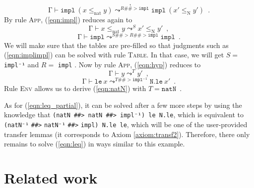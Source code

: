 \documentclass{llncs}
\begin{document}
\begin{example}
\begin{equation}
    \enspace ,
    \label{eqn:leq}
    \end{equation}
    \begin{equation}
    \mathrm{\Gamma} \vdash
    \mathtt{impl}~(x \leq_{\mathrm{nat}} y)
    \leadsto^{R \#\#> \mathtt{impl}}
    \mathtt{impl}~(x' \leq_{\mathrm{N}} y')
    \enspace .
    \label{eqn:impl}
    \end{equation}
    By rule \textsc{App}, (\ref{eqn:impl}) reduces again to
    \begin{equation}
    \mathrm{\Gamma} \vdash
    x \leq_{\mathrm{nat}} y \leadsto^{S} x' \leq_{\mathrm{N}} y'
    \enspace ,
    \label{eqn:hyp}
    \end{equation}
    \begin{equation}
    \mathrm{\Gamma} \vdash
    \mathtt{impl} \leadsto^{S \#\#> R \#\#> \mathtt{impl}} \mathtt{impl}
    \enspace .
    \label{eqn:implimpl}
    \end{equation}
    We will make sure that
    the tables are pre-filled so that judgments such as
    (\ref{eqn:implimpl}) can be solved with rule \textsc{Table}.
    In that case, we will get $S =$ \verb|impl⁻¹| and
    $R =$ \verb|impl| .
    Now by rule \textsc{App}, (\ref{eqn:hyp}) reduces to
    \begin{equation}
    \mathrm{\Gamma} \vdash y \leadsto^T y'
    \enspace ,
    \label{eqn:natN}
    \end{equation}
    \begin{equation}
    \mathrm{\Gamma} \vdash \mathtt{le}~x
    \leadsto^{T \#\#> \mathtt{impl^{-1}}} \mathtt{N.le}~x'
    \enspace .
    \label{eqn:leq_partial}
    \end{equation}
    Rule \textsc{Env} allows us to derive (\ref{eqn:natN}) with
    $T = \mathtt{natN}\enspace$.

    As for (\ref{eqn:leq_partial}), it can be solved after a few
    more steps by using the knowledge that
    \verb|(natN ##> natN ##> impl⁻¹) le N.le|, which is equivalent to
    \verb|(natN⁻¹| \verb|##>| \verb|natN⁻¹| \verb|##>| \verb|impl) N.le le|,
    which will be one of the user-provided transfer lemmas
    (it corresponds to Axiom \ref{axiom:transf2}).
    Therefore, there only remains to solve (\ref{eqn:leq}) in ways
    similar to this example.
\end{example}

\section{Related work}
\end{document}

